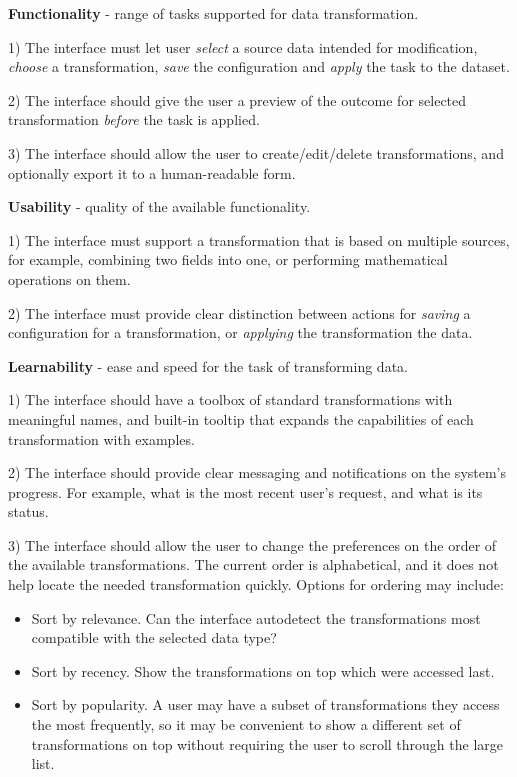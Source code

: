\documentclass[12pt,letterpaper]{article}
\begin{document}
\bigskip
\textbf{Functionality} - range of tasks supported for data transformation.

1) The interface must let user \textit{select} a source data intended for modification, \textit{choose} a transformation, \textit{save} the configuration and \textit{apply} the task to the dataset.

2) The interface should give the user a preview of the outcome for selected transformation \textit{before} the task is applied.

3) The interface should allow the user to create/edit/delete transformations, and optionally export it to a human-readable form.

\textbf{Usability} - quality of the available functionality.

1) The interface must support a transformation that is based on multiple sources, for example, combining two fields into one, or performing mathematical operations on them.

2) The interface must provide clear distinction between actions for \textit{saving} a configuration for a transformation, or \textit{applying} the transformation the data.

\textbf{Learnability} - ease and speed for the task of transforming data.

1) The interface should have a toolbox of standard transformations with meaningful names, and built-in tooltip that expands the capabilities of each transformation with examples.

2) The interface should provide clear messaging and notifications on the system's progress. For example, what is the most recent user's request, and what is its status.

3) The interface should allow the user to change the preferences on the order of the available transformations. The current order is alphabetical, and it does not help locate the needed transformation quickly. Options for ordering may include: 

\begin{itemize}
    \item Sort by relevance. Can the interface autodetect the transformations most compatible with the selected data type?
    \item Sort by recency. Show the transformations on top which were accessed last.
    \item Sort by popularity. A user may have a subset of transformations they access the most frequently, so it may be convenient to show a different set of transformations on top without requiring the user to scroll through the large list. 
\end{itemize}
\end{document}
